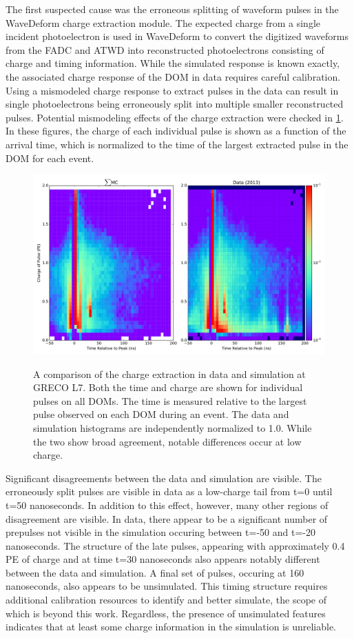 The first suspected cause was the erroneous splitting of waveform pulses in the WaveDeform charge extraction module.
The expected charge from a single incident photoelectron is used in WaveDeform to convert the digitized waveforms from the FADC and ATWD into reconstructed photoelectrons consisting of charge and timing information.
While the simulated response is known exactly, the associated charge response of the DOM in data requires careful calibration.
Using a mismodeled charge response to extract pulses in the data can result in single photoelectrons being erroneously split into multiple smaller reconstructed pulses.
Potential mismodeling effects of the charge extraction were checked in \ref{fig:pulse_timing_profile}. 
In these figures, the charge of each individual pulse is shown as a function of the arrival time, which is normalized to the time of the largest extracted pulse in the DOM for each event.

\begin{figure}
\centering
	\includegraphics[width=0.9\linewidth]{2d_maps_detail_raw.png}
\label{fig:pulse_timing_profile}
\caption{A comparison of the charge extraction in data and simulation at GRECO L7. Both the time and charge are shown for individual pulses on all DOMs. The time is measured relative to the largest pulse observed on each DOM during an event. The data and simulation histograms are independently normalized to 1.0. While the two show broad agreement, notable differences occur at low charge.}
\end{figure}

Significant disagreements between the data and simulation are visible.
The erroneously split pulses are visible in data as a low-charge tail from t=0 until t=50 nanoseconds.
In addition to this effect, however, many other regions of disagreement are visible.
In data, there appear to be a significant number of prepulses not visible in the simulation occuring between t=-50 and t=-20 nanoseconds.
The structure of the late pulses, appearing with approximately 0.4 PE of charge and at time t=30 nanoseconds also appears notably different between the data and simulation.
A final set of pulses, occuring at 160 nanoseconds, also appears to be unsimulated.
This timing structure requires additional calibration resources to identify and better simulate, the scope of which is beyond this work.
Regardless, the presence of unsimulated features indicates that at least some charge information in the simulation is unreliable.

